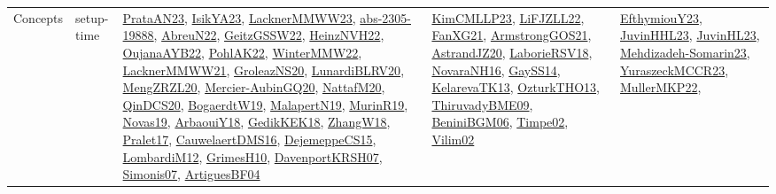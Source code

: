 {\begin{longtable}{lp{3cm}>{\raggedright}p{6cm}>{\raggedright}p{6cm}p{8cm}}
Concepts & setup-time & \href{articles/PrataAN23.pdf}{PrataAN23}\cite{PrataAN23}, \href{articles/IsikYA23.pdf}{IsikYA23}\cite{IsikYA23}, \href{articles/LacknerMMWW23.pdf}{LacknerMMWW23}\cite{LacknerMMWW23}, \href{articles/abs-2305-19888.pdf}{abs-2305-19888}\cite{abs-2305-19888}, \href{articles/AbreuN22.pdf}{AbreuN22}\cite{AbreuN22}, \href{papers/GeitzGSSW22.pdf}{GeitzGSSW22}\cite{GeitzGSSW22}, \href{articles/HeinzNVH22.pdf}{HeinzNVH22}\cite{HeinzNVH22}, \href{papers/OujanaAYB22.pdf}{OujanaAYB22}\cite{OujanaAYB22}, \href{articles/PohlAK22.pdf}{PohlAK22}\cite{PohlAK22}, \href{papers/WinterMMW22.pdf}{WinterMMW22}\cite{WinterMMW22}, \href{papers/LacknerMMWW21.pdf}{LacknerMMWW21}\cite{LacknerMMWW21}, \href{papers/GroleazNS20.pdf}{GroleazNS20}\cite{GroleazNS20}, \href{articles/LunardiBLRV20.pdf}{LunardiBLRV20}\cite{LunardiBLRV20}, \href{articles/MengZRZL20.pdf}{MengZRZL20}\cite{MengZRZL20}, \href{papers/Mercier-AubinGQ20.pdf}{Mercier-AubinGQ20}\cite{Mercier-AubinGQ20}, \href{papers/NattafM20.pdf}{NattafM20}\cite{NattafM20}, \href{articles/QinDCS20.pdf}{QinDCS20}\cite{QinDCS20}, \href{papers/BogaerdtW19.pdf}{BogaerdtW19}\cite{BogaerdtW19}, \href{papers/MalapertN19.pdf}{MalapertN19}\cite{MalapertN19}, \href{papers/MurinR19.pdf}{MurinR19}\cite{MurinR19}, \href{articles/Novas19.pdf}{Novas19}\cite{Novas19}, \href{papers/ArbaouiY18.pdf}{ArbaouiY18}\cite{ArbaouiY18}, \href{articles/GedikKEK18.pdf}{GedikKEK18}\cite{GedikKEK18}, \href{articles/ZhangW18.pdf}{ZhangW18}\cite{ZhangW18}, \href{papers/Pralet17.pdf}{Pralet17}\cite{Pralet17}, \href{papers/CauwelaertDMS16.pdf}{CauwelaertDMS16}\cite{CauwelaertDMS16}, \href{papers/DejemeppeCS15.pdf}{DejemeppeCS15}\cite{DejemeppeCS15}, \href{articles/LombardiM12.pdf}{LombardiM12}\cite{LombardiM12}, \href{papers/GrimesH10.pdf}{GrimesH10}\cite{GrimesH10}, \href{papers/DavenportKRSH07.pdf}{DavenportKRSH07}\cite{DavenportKRSH07}, \href{articles/Simonis07.pdf}{Simonis07}\cite{Simonis07}, \href{papers/ArtiguesBF04.pdf}{ArtiguesBF04}\cite{ArtiguesBF04} & \href{papers/KimCMLLP23.pdf}{KimCMLLP23}\cite{KimCMLLP23}, \href{papers/LiFJZLL22.pdf}{LiFJZLL22}\cite{LiFJZLL22}, \href{articles/FanXG21.pdf}{FanXG21}\cite{FanXG21}, \href{papers/ArmstrongGOS21.pdf}{ArmstrongGOS21}\cite{ArmstrongGOS21}, \href{articles/AstrandJZ20.pdf}{AstrandJZ20}\cite{AstrandJZ20}, \href{articles/LaborieRSV18.pdf}{LaborieRSV18}\cite{LaborieRSV18}, \href{articles/NovaraNH16.pdf}{NovaraNH16}\cite{NovaraNH16}, \href{papers/GaySS14.pdf}{GaySS14}\cite{GaySS14}, \href{papers/KelarevaTK13.pdf}{KelarevaTK13}\cite{KelarevaTK13}, \href{articles/OzturkTHO13.pdf}{OzturkTHO13}\cite{OzturkTHO13}, \href{papers/ThiruvadyBME09.pdf}{ThiruvadyBME09}\cite{ThiruvadyBME09}, \href{papers/BeniniBGM06.pdf}{BeniniBGM06}\cite{BeniniBGM06}, \href{articles/Timpe02.pdf}{Timpe02}\cite{Timpe02}, \href{papers/Vilim02.pdf}{Vilim02}\cite{Vilim02} & \href{papers/EfthymiouY23.pdf}{EfthymiouY23}\cite{EfthymiouY23}, \href{papers/JuvinHHL23.pdf}{JuvinHHL23}\cite{JuvinHHL23}, \href{papers/JuvinHL23.pdf}{JuvinHL23}\cite{JuvinHL23}, \href{papers/Mehdizadeh-Somarin23.pdf}{Mehdizadeh-Somarin23}\cite{Mehdizadeh-Somarin23}, \href{articles/YuraszeckMCCR23.pdf}{YuraszeckMCCR23}\cite{YuraszeckMCCR23}, \href{articles/MullerMKP22.pdf}{MullerMKP22}\cite{MullerMKP22}, 
\end{longtable}}
